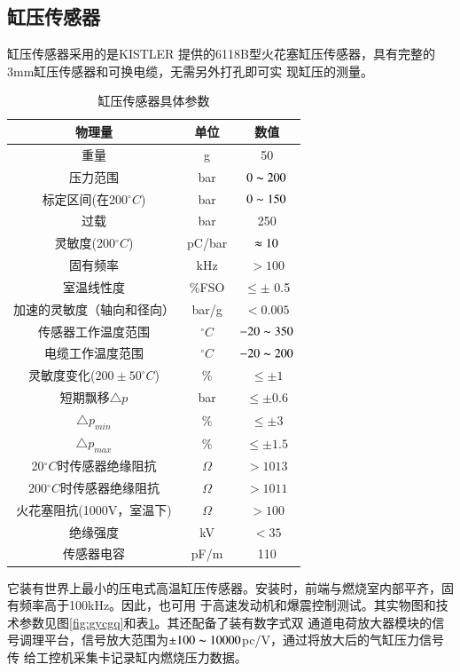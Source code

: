 \subsection{缸压传感器}
缸压传感器采用的是KISTLER 提供的6118B型火花塞缸压传感器，具有完整的3mm缸压传感器和可换电缆，无需另外打孔即可实
现缸压的测量。
\begin{table}[H]
	\caption{缸压传感器具体参数}
	\label{tab:gycgq}
	\centering
	\begin{tabular}{ccc}
	\hline
	物理量 & 单位& 数值 \\
	\hline
	重量 & g& 50\\
	压力范围 & bar & $0\thicksim 200$ \\
	标定区间(在200$^{\circ}C$) &bar & $0\thicksim 150$ \\
	过载 & bar & 250 \\
	灵敏度(200$^{\circ}C$) & pC/bar & $\thickapprox10$ \\
	固有频率 & kHz & $>100$ \\
	室温线性度 & \%FSO & $\leq \pm$ 0.5 \\
	加速的灵敏度（轴向和径向） & bar/g & $<0.005$ \\
	传感器工作温度范围 & $^{\circ}C$ & $-20\thicksim 350$ \\
	电缆工作温度范围 & $^{\circ}C$ & $-20 \thicksim 200$ \\
	灵敏度变化($200\pm 50^{\circ}C$)&\%& $\leq\pm 1$ \\
	短期飘移$\triangle p$ & bar & $\leq \pm 0.6$ \\
	$\triangle p_{min}$ & \% & $\leq \pm 3$ \\
	$\triangle p_{max}$ & \% & $\leq \pm 1.5$ \\
	20$^{\circ}C$时传感器绝缘阻抗 & $\Omega$ & $>1013$ \\
	200$^{\circ}C$时传感器绝缘阻抗 & $\Omega$ & $>1011$ \\
	火花塞阻抗(1000V，室温下) & $\Omega$& $>100$ \\
	绝缘强度 & kV& $<35$ \\
	传感器电容 & pF/m& 110\\
	\hline
	\end{tabular}
\end{table}
它装有世界上最小的压电式高温缸压传感器。安装时，前端与燃烧室内部平齐，固有频率高于100kHz。因此，也可用
于高速发动机和爆震控制测试。其实物图和技术参数见图\ref{fig:gycgq}和表\ref{tab:gycgq}。其还配备了装有数字式双
通道电荷放大器模块的信号调理平台，信号放大范围为$\pm 100\thicksim 10000$pc/V，通过将放大后的气缸压力信号传
给工控机采集卡记录缸内燃烧压力数据。

